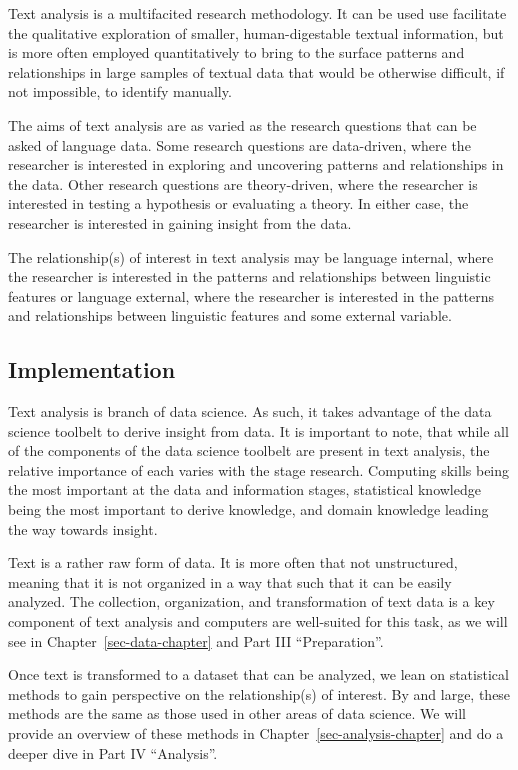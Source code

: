 \documentclass[
  letterpaper,
]{book}
\theoremstyle{definition}
\theoremstyle{remark}
\begin{document}
Text analysis is a multifacited research methodology. It can be used use
facilitate the qualitative exploration of smaller, human-digestable
textual information, but is more often employed quantitatively to bring
to the surface patterns and relationships in large samples of textual
data that would be otherwise difficult, if not impossible, to identify
manually.

The aims of text analysis are as varied as the research questions that
can be asked of language data. Some research questions are data-driven,
where the researcher is interested in exploring and uncovering patterns
and relationships in the data. Other research questions are
theory-driven, where the researcher is interested in testing a
hypothesis or evaluating a theory. In either case, the researcher is
interested in gaining insight from the data.

The relationship(s) of interest in text analysis may be language
internal, where the researcher is interested in the patterns and
relationships between linguistic features or language external, where
the researcher is interested in the patterns and relationships between
linguistic features and some external variable.

\subsection{Implementation}\label{implementation}

Text analysis is branch of data science. As such, it takes advantage of
the data science toolbelt to derive insight from data. It is important
to note, that while all of the components of the data science toolbelt
are present in text analysis, the relative importance of each varies
with the stage research. Computing skills being the most important at
the data and information stages, statistical knowledge being the most
important to derive knowledge, and domain knowledge leading the way
towards insight.

Text is a rather raw form of data. It is more often that not
unstructured, meaning that it is not organized in a way that such that
it can be easily analyzed. The collection, organization, and
transformation of text data is a key component of text analysis and
computers are well-suited for this task, as we will see in
Chapter~\ref{sec-data-chapter} and Part III ``Preparation''.

Once text is transformed to a dataset that can be analyzed, we lean on
statistical methods to gain perspective on the relationship(s) of
interest. By and large, these methods are the same as those used in
other areas of data science. We will provide an overview of these
methods in Chapter~\ref{sec-analysis-chapter} and do a deeper dive in
Part IV ``Analysis''.
\end{document}
